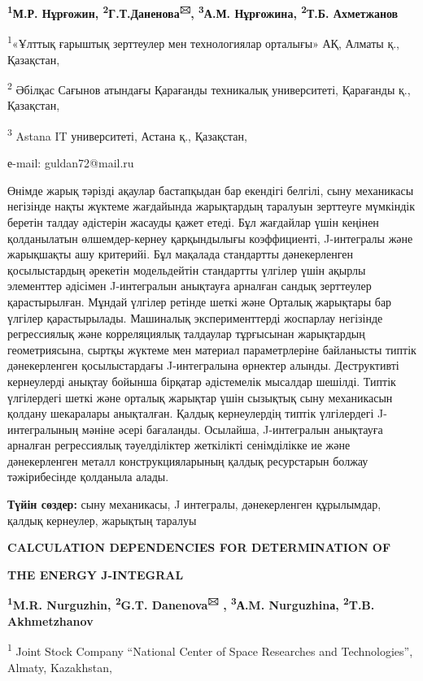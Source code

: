 {\bfseries \textsuperscript{1}М.Р. Нұрғожин,
\textsuperscript{2}Г.Т.Даненова\textsuperscript{🖂},
\textsuperscript{3}А.М. Нұрғожина, \textsuperscript{2}Т.Б. Ахметжанов}

\textsuperscript{1}«Ұлттық ғарыштық зерттеулер мен технологиялар
орталығы» АҚ, Алматы қ., Қазақстан,

\textsuperscript{2} Әбілқас Сағынов атындағы Қарағанды техникалық
университеті, Қарағанды қ., Қазақстан,

\textsuperscript{3} Astana IT университеті, Астана қ., Қазақстан,

е-mail: guldan72@mail.ru

Өнімде жарық тәрізді ақаулар бастапқыдан бар екендігі белгілі, сыну
механикасы негізінде нақты жүктеме жағдайында жарықтардың таралуын
зерттеуге мүмкіндік беретін талдау әдістерін жасауды қажет етеді. Бұл
жағдайлар үшін кеңінен қолданылатын өлшемдер-кернеу қарқындылығы
коэффициенті, J-интегралы және жарықшақты ашу критерийі. Бұл мақалада
стандартты дәнекерленген қосылыстардың әрекетін модельдейтін стандартты
үлгілер үшін ақырлы элементтер әдісімен J-интегралын анықтауға арналған
сандық зерттеулер қарастырылған. Мұндай үлгілер ретінде шеткі және
Орталық жарықтары бар үлгілер қарастырылады. Машиналық эксперименттерді
жоспарлау негізінде регрессиялық және корреляциялық талдаулар тұрғысынан
жарықтардың геометриясына, сыртқы жүктеме мен материал параметрлеріне
байланысты типтік дәнекерленген қосылыстардағы J-интегралына өрнектер
алынды. Деструктивті кернеулерді анықтау бойынша бірқатар әдістемелік
мысалдар шешілді. Типтік үлгілердегі шеткі және орталық жарықтар үшін
сызықтық сыну механикасын қолдану шекаралары анықталған. Қалдық
кернеулердің типтік үлгілердегі J-интегралының мәніне әсері бағаланды.
Осылайша, J-интегралын анықтауға арналған регрессиялық тәуелділіктер
жеткілікті сенімділікке ие және дәнекерленген металл конструкцияларының
қалдық ресурстарын болжау тәжірибесінде қолданыла алады.

{\bfseries Түйін сөздер:} сыну механикасы, J интегралы, дәнекерленген
құрылымдар, қалдық кернеулер, жарықтың таралуы

{\bfseries CALCULATION DEPENDENCIES FOR DETERMINATION OF}

{\bfseries THE ENERGY J-INTEGRAL}

{\bfseries \textsuperscript{1}M.R. Nurguzhin, \textsuperscript{2}G.T.
Danenova\textsuperscript{🖂} , \textsuperscript{3}А.M. Nurguzhinа,
\textsuperscript{2}T.B. Akhmetzhanov}

\textsuperscript{1} Joint Stock Company ``National Center of Space
Researches and Technologies'', Almaty, Kazakhstan,

